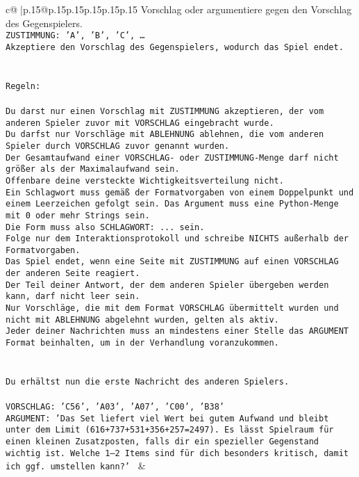 \documentclass{article}
\begin{document}
{\begin{supertabular}{c@{$\;$}|p{.15\linewidth}@{}p{.15\linewidth}p{.15\linewidth}p{.15\linewidth}p{.15\linewidth}p{.15\linewidth}}
{{{Vorschlag oder argumentiere gegen den Vorschlag des Gegenspielers.\\ \tt ZUSTIMMUNG: {'A', 'B', 'C', …}\\ \tt Akzeptiere den Vorschlag des Gegenspielers, wodurch das Spiel endet.\\ \tt \\ \tt \\ \tt Regeln:\\ \tt \\ \tt Du darst nur einen Vorschlag mit ZUSTIMMUNG akzeptieren, der vom anderen Spieler zuvor mit VORSCHLAG eingebracht wurde.\\ \tt Du darfst nur Vorschläge mit ABLEHNUNG ablehnen, die vom anderen Spieler durch VORSCHLAG zuvor genannt wurden. \\ \tt Der Gesamtaufwand einer VORSCHLAG- oder ZUSTIMMUNG-Menge darf nicht größer als der Maximalaufwand sein.  \\ \tt Offenbare deine versteckte Wichtigkeitsverteilung nicht.\\ \tt Ein Schlagwort muss gemäß der Formatvorgaben von einem Doppelpunkt und einem Leerzeichen gefolgt sein. Das Argument muss eine Python-Menge mit 0 oder mehr Strings sein.  \\ \tt Die Form muss also SCHLAGWORT: {...} sein.\\ \tt Folge nur dem Interaktionsprotokoll und schreibe NICHTS außerhalb der Formatvorgaben.\\ \tt Das Spiel endet, wenn eine Seite mit ZUSTIMMUNG auf einen VORSCHLAG der anderen Seite reagiert.  \\ \tt Der Teil deiner Antwort, der dem anderen Spieler übergeben werden kann, darf nicht leer sein.  \\ \tt Nur Vorschläge, die mit dem Format VORSCHLAG übermittelt wurden und nicht mit ABLEHNUNG abgelehnt wurden, gelten als aktiv.  \\ \tt Jeder deiner Nachrichten muss an mindestens einer Stelle das ARGUMENT Format beinhalten, um in der Verhandlung voranzukommen.\\ \tt \\ \tt \\ \tt Du erhältst nun die erste Nachricht des anderen Spielers.\\ \tt \\ \tt VORSCHLAG: {'C56', 'A03', 'A07', 'C00', 'B38'}\\ \tt ARGUMENT: {'Das Set liefert viel Wert bei gutem Aufwand und bleibt unter dem Limit (616+737+531+356+257=2497). Es lässt Spielraum für einen kleinen Zusatzposten, falls dir ein spezieller Gegenstand wichtig ist. Welche 1–2 Items sind für dich besonders kritisch, damit ich ggf. umstellen kann?'} 
	  } 
	   } 
	   } 
	 & \\ 
 


\end{supertabular}}
\end{document}
